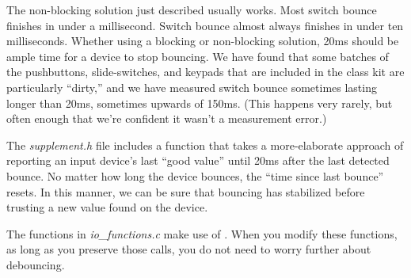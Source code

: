 The non-blocking solution just described usually works.
Most switch bounce finishes in under a millisecond.
Switch bounce almost always finishes in under ten milliseconds.
Whether using a blocking or non-blocking solution, 20ms should be ample time for a device to stop bouncing.
We have found that some batches of the pushbuttons, slide-switches, and keypads that are included in the class kit are particularly ``dirty,'' and we have measured switch bounce sometimes lasting longer than 20ms, sometimes upwards of 150ms.
(This happens very rarely, but often enough that we're confident it wasn't a measurement error.)

The \textit{supplement.h} file includes a  function that takes a more-elaborate approach of reporting an input device's last ``good value'' until 20ms after the last detected bounce.
No matter how long the device bounces, the ``time since last bounce'' resets.
In this manner, we can be sure that bouncing has stabilized before trusting a new value found on the device.

The functions in \textit{io\_functions.c} make use of .
When you modify these functions, as long as you preserve those  calls, you do not need to worry further about debouncing.
